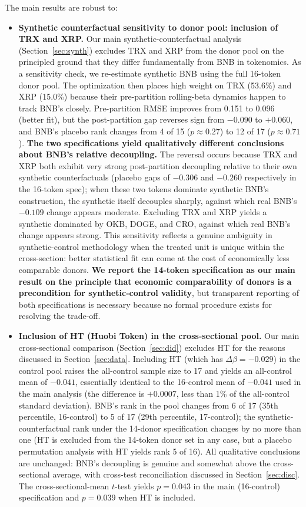 \documentclass[11pt,a4paper]{article}
\begin{document}
The main results are robust to:
\begin{itemize}
\item \textbf{Synthetic counterfactual sensitivity to donor pool: inclusion of TRX and XRP.} Our main synthetic-counterfactual analysis (Section~\ref{sec:synth}) excludes TRX and XRP from the donor pool on the principled ground that they differ fundamentally from BNB in tokenomics. As a sensitivity check, we re-estimate synthetic BNB using the full 16-token donor pool. The optimization then places high weight on TRX (53.6\%) and XRP (15.0\%) because their pre-partition rolling-beta dynamics happen to track BNB's closely. Pre-partition RMSE improves from 0.151 to 0.096 (better fit), but the post-partition gap reverses sign from $-0.090$ to $+0.060$, and BNB's placebo rank changes from 4 of 15 ($p \approx 0.27$) to 12 of 17 ($p \approx 0.71$). \textbf{The two specifications yield qualitatively different conclusions about BNB's relative decoupling.} The reversal occurs because TRX and XRP both exhibit very strong post-partition decoupling relative to their own synthetic counterfactuals (placebo gaps of $-0.306$ and $-0.260$ respectively in the 16-token spec); when these two tokens dominate synthetic BNB's construction, the synthetic itself decouples sharply, against which real BNB's $-0.109$ change appears moderate. Excluding TRX and XRP yields a synthetic dominated by OKB, DOGE, and CRO, against which real BNB's change appears strong. This sensitivity reflects a genuine ambiguity in synthetic-control methodology when the treated unit is unique within the cross-section: better statistical fit can come at the cost of economically less comparable donors. \textbf{We report the 14-token specification as our main result on the principle that economic comparability of donors is a precondition for synthetic-control validity}, but transparent reporting of both specifications is necessary because no formal procedure exists for resolving the trade-off.

\item \textbf{Inclusion of HT (Huobi Token) in the cross-sectional pool.} Our main cross-sectional comparison (Section~\ref{sec:did}) excludes HT for the reasons discussed in Section~\ref{sec:data}. Including HT (which has $\Delta\beta = -0.029$) in the control pool raises the all-control sample size to 17 and yields an all-control mean of $-0.041$, essentially identical to the 16-control mean of $-0.041$ used in the main analysis (the difference is $+0.0007$, less than 1\% of the all-control standard deviation). BNB's rank in the pool changes from 6 of 17 (35th percentile, 16-control) to 5 of 17 (29th percentile, 17-control); the synthetic-counterfactual rank under the 14-donor specification changes by no more than one (HT is excluded from the 14-token donor set in any case, but a placebo permutation analysis with HT yields rank 5 of 16). All qualitative conclusions are unchanged: BNB's decoupling is genuine and somewhat above the cross-sectional average, with cross-test reconciliation discussed in Section~\ref{sec:disc}. The cross-sectional-mean $t$-test yields $p=0.043$ in the main (16-control) specification and $p=0.039$ when HT is included.


\end{itemize}
\end{document}
